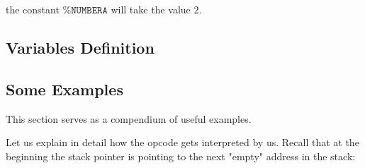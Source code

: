 the constant $\texttt{\%}\mathtt{NUMBERA}$ will take the value $2$.



\subsection{Variables Definition}





\subsection{Some Examples}

This section serves as a compendium of useful examples.


Let us explain in detail how the \ADD opcode gets interpreted by us. Recall that at the beginning the stack pointer is pointing to the next "empty" address in the stack:

